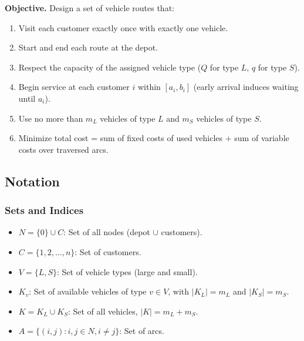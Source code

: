 \documentclass[11pt]{article}
\begin{document}
\textbf{Objective.} Design a set of vehicle routes that:
\begin{enumerate}[leftmargin=*]
    \item Visit each customer exactly once with exactly one vehicle.
    \item Start and end each route at the depot.
    \item Respect the capacity of the assigned vehicle type ($Q$ for type $L$, $q$ for type $S$).
    \item Begin service at each customer $i$ within $[a_i, b_i]$ (early arrival induces waiting until $a_i$).
    \item Use no more than $m_L$ vehicles of type $L$ and $m_S$ vehicles of type $S$.
    \item Minimize total cost = sum of fixed costs of used vehicles + sum of variable costs over traversed arcs.
\end{enumerate}

\subsection{Notation}

\subsubsection{Sets and Indices}
\begin{itemize}[leftmargin=*]
    \item $N = \{0\} \cup C$: Set of all nodes (depot $\cup$ customers).
    \item $C = \{1, 2, \ldots, n\}$: Set of customers.
    \item $V = \{L, S\}$: Set of vehicle types (large and small).
    \item $K_v$: Set of available vehicles of type $v \in V$, with $|K_L| = m_L$ and $|K_S| = m_S$.
    \item $K = K_L \cup K_S$: Set of all vehicles, $|K| = m_L + m_S$.
    \item $A = \{(i,j) : i,j \in N, i \neq j\}$: Set of arcs.
\end{itemize}
\end{document}

